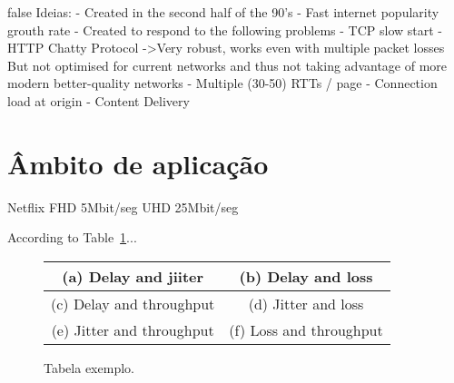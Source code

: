 \documentclass{llncs}
\begin{document}
\if false
Ideias: 	
	- Created in the second half of the 90's
	- Fast internet popularity grouth rate
	- Created to respond to the following problems
		- TCP slow start
		- HTTP Chatty Protocol
			->Very robust, works even with multiple packet losses
			    But not optimised for current networks and thus not taking advantage
			    of more modern better-quality networks
		- Multiple (30-50) RTTs / page
		- Connection load at origin
		- Content Delivery
\fi 

\section{Âmbito de aplicação}

Netflix FHD 5Mbit/seg
	   UHD 25Mbit/seg



According to Table~\ref{tab:TabelaExemplo}...

\begin{figure}
\centering
\begin{tabular}{|c|c|}\hline
(a) Delay and jiiter & (b) Delay and loss \\ \hline

(c) Delay and throughput & (d) Jitter and loss \\ \hline

(e) Jitter and throughput & (f) Loss and throughput \\ \hline
\end{tabular}
\caption{\label{tab:TabelaExemplo}Tabela exemplo.}
\end{figure}

\end{document}
